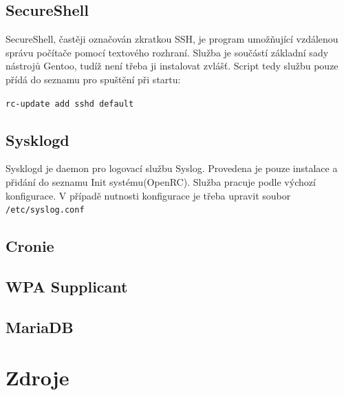 \documentclass[12pt,a4paper,twoside,]{article}
\begin{document}
\subsection{\textsf{SecureShell}}
SecureShell, častěji označován zkratkou SSH, je program umožňující vzdálenou správu počítače pomocí textového rozhraní. Služba je součástí základní sady nástrojů Gentoo, tudíž není třeba ji instalovat zvlášť. Script tedy službu pouze přídá do seznamu pro spuštění při startu: 

\texttt{rc-update add sshd default}
\subsection{\textsf{Sysklogd}} %
Sysklogd je daemon pro logovací službu Syslog. Provedena je pouze instalace a přidání do seznamu Init systému(OpenRC). Služba pracuje podle výchozí konfigurace. V případě nutnosti konfigurace je třeba upravit soubor \texttt{/etc/syslog.conf}

\subsection{\textsf{Cronie}}
\subsection{\textsf{WPA Supplicant}}
\subsection{\textsf{MariaDB}}
\section{\textsf{Zdroje}}
\end{document}
